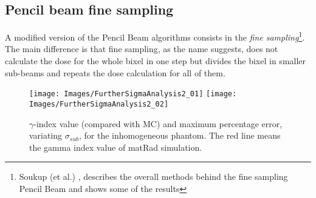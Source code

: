 \documentclass[12pt, a4paper, twoside]{book}
\begin{document}
\subsection{Pencil beam fine sampling}\label{FS}
A modified version of the Pencil Beam algorithms consists in the \emph{fine sampling}\footnote{Soukup (et al.) \cite{souk:pba}, describes the overall methods behind the fine sampling Pencil Beam and shows some of the results}.
The main difference is that fine sampling, as the name suggests, does not calculate the dose for the whole bixel in one step but divides the bixel in smaller sub-beams and repeats the dose calculation for all of them. 
\begin{figure}[t]
{\texttt{[image: Images/FurtherSigmaAnalysis2\_01]}}
{\texttt{[image: Images/FurtherSigmaAnalysis2\_02]}}
\caption{$\gamma$-index value (compared with MC) and maximum percentage error, variating $\sigma_{sub}$, for the inhomogeneous phantom. The red line means the gamma index value of matRad simulation.}
\label{fig:sigsub}
\end{figure}
\end{document}
